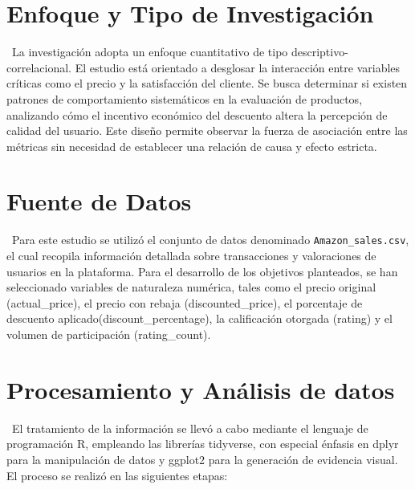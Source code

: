\documentclass[oneside,11pt]{Latex/Classes/PhDthesisPSnPDF}
\begin{document}
\section{Enfoque y Tipo de Investigación}

~La investigación adopta un enfoque cuantitativo de tipo
descriptivo-correlacional. El estudio está orientado a desglosar la
interacción entre variables críticas como el precio y la satisfacción
del cliente. Se busca determinar si existen patrones de comportamiento
sistemáticos en la evaluación de productos, analizando cómo el incentivo
económico del descuento altera la percepción de calidad del usuario.
Este diseño permite observar la fuerza de asociación entre las métricas
sin necesidad de establecer una relación de causa y efecto estricta.

\section{Fuente de Datos}

~Para este estudio se utilizó el conjunto de datos denominado
\texttt{Amazon\_sales.csv}, el cual recopila información detallada sobre
transacciones y valoraciones de usuarios en la plataforma. Para el
desarrollo de los objetivos planteados, se han seleccionado variables de
naturaleza numérica, tales como el precio original (actual\_price), el
precio con rebaja (discounted\_price), el porcentaje de descuento
aplicado(discount\_percentage), la calificación otorgada (rating) y el
volumen de participación (rating\_count).

\section{Procesamiento y Análisis de datos}

~El tratamiento de la información se llevó a cabo mediante el lenguaje
de programación R, empleando las librerías tidyverse, con especial
énfasis en dplyr para la manipulación de datos y ggplot2 para la
generación de evidencia visual. El proceso se realizó en las siguientes
etapas:
\end{document}

